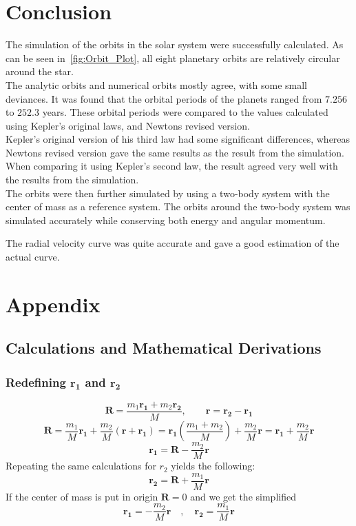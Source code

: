 \documentclass[reprint,english,notitlepage]{revtex4-2}
\begin{document}
\section{Conclusion}
The simulation of the orbits in the solar system were successfully calculated.
As can be seen in~\ref{fig:Orbit_Plot}, all eight planetary orbits are relatively circular around the star.\\
The analytic orbits and numerical orbits mostly agree, with some small deviances.
It was found that the orbital periods of the planets ranged from $7.256$ to $252.3$ years.
These orbital periods were compared to the values calculated using Kepler's original laws, and Newtons revised version.\\
Kepler's original version of his third law had some significant differences, whereas Newtons revised version gave the same results as the result from the simulation.
When comparing it using Kepler's second law, the result agreed very well with the results from the simulation.\\

The orbits were then further simulated by using a two-body system with the center of mass as a reference system.
The orbits around the two-body system was simulated accurately while conserving both energy and angular momentum.


The radial velocity curve was quite accurate and gave a good estimation of the actual curve. 

\section{Appendix}

	\subsection{Calculations and Mathematical Derivations}
		\subsubsection{Redefining $ \mathbf{r_1} $ and $ \mathbf{r_2} $}\label{r1r2 calc}
			\[
			\mathbf{R} = \frac{m_1 \mathbf{r_1} + m_2 \mathbf{r_2}}{M}, \qquad \mathbf{r} = \mathbf{r_2} - \mathbf{r_1}
			\]
			\[
			\mathbf{R} = \frac{m_1}{M}\mathbf{r_1} + \frac{m_2}{M} \left( \mathbf{r} + \mathbf{r_1} \right) = \mathbf{r_1} \left( \frac{m_1 + m_2}{M} \right) + \frac{m_2}{M} \mathbf{r} = \mathbf{r_1} + \frac{m_2}{M} \mathbf{r}
			\]
			\[
			\mathbf{r_1} = \mathbf{R} - \frac{m_2}{M}\mathbf{r}
			\]
			Repeating the same calculations for $ r_2 $ yields the following: 
			\[
			\mathbf{r_2} = \mathbf{R} + \frac{m_1}{M} \mathbf{r}
			\]
			If the center of mass is put in origin $ \mathbf{R} = 0 $ and we get the simplified
			\[
			\mathbf{r_1} = - \frac{m_2}{M}\mathbf{r} \quad , \quad \mathbf{r_2} = \frac{m_1}{M}\mathbf{r}
			\]
\end{document}
